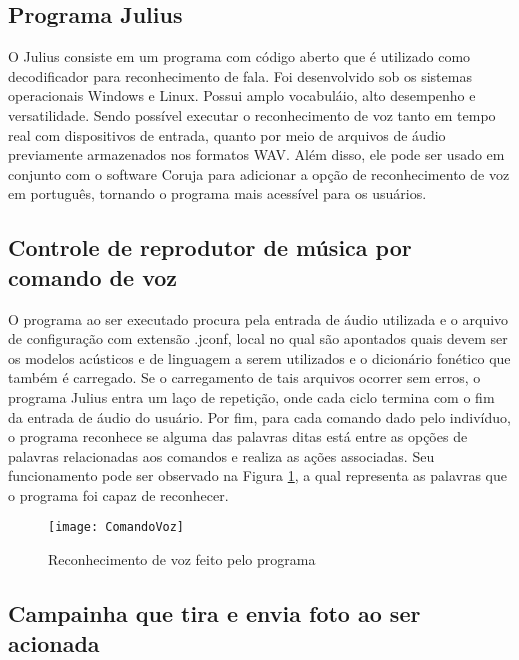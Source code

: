 \subsection{Programa Julius}

O Julius consiste em um programa com código aberto que é utilizado como decodificador para reconhecimento de fala. 
Foi desenvolvido sob os sistemas operacionais Windows e Linux. Possui amplo vocabuláio, alto desempenho e versatilidade. 
Sendo possível executar o reconhecimento de voz tanto em tempo real com dispositivos de entrada, quanto por meio de arquivos de áudio previamente armazenados nos formatos WAV.
Além disso, ele pode ser usado em conjunto com o software Coruja para adicionar a opção de reconhecimento de voz em português, tornando o programa mais acessível para os usuários.


\subsection{Controle de reprodutor de música por comando de voz}

O programa ao ser executado procura pela entrada de áudio utilizada e o arquivo de configuração com extensão .jconf, local no qual são apontados quais devem ser os modelos acústicos e de linguagem a serem utilizados e o dicionário fonético que também é carregado. 
Se o carregamento de tais arquivos ocorrer sem erros, o programa Julius entra um laço de repetição, onde cada ciclo termina com o fim da entrada de áudio do usuário. Por fim, para cada comando dado pelo indivíduo, o programa reconhece se alguma das palavras ditas está entre as opções de palavras relacionadas aos comandos e realiza as ações associadas. Seu funcionamento pode ser observado na Figura \ref{fig-ComandoVoz}, a qual representa as palavras que o programa foi capaz de reconhecer.

\begin{figure}[htbp]
	\centering
		\texttt{[image: ComandoVoz]}
	\caption{Reconhecimento de voz feito pelo programa}
	\label{fig-ComandoVoz}
\end{figure}

\subsection{Campainha que tira e envia foto ao ser acionada}

